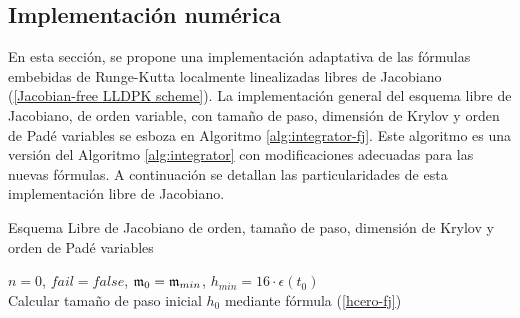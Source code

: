 \subsection{Implementación numérica}

En esta sección, se propone una implementación adaptativa de las fórmulas embebidas de Runge-Kutta localmente linealizadas libres de Jacobiano (\ref{Jacobian-free LLDPK scheme}). La implementación general del esquema libre de Jacobiano, de orden variable, con tamaño de paso, dimensión de Krylov y orden de Padé variables se esboza en Algoritmo \ref{alg:integrator-fj}. Este algoritmo es una versión del Algoritmo \ref{alg:integrator} con modificaciones adecuadas para las nuevas fórmulas. A continuación se detallan las particularidades de esta implementación libre de Jacobiano.

{\SetAlgoNoLine
	\begin{algorithm}[htb]
		\caption{Esquema Libre de Jacobiano de orden, tamaño de paso, dimensión de Krylov y orden de Padé variables}
		\label{alg:integrator-fj}
		$n=0$, $fail=false$, $\mathfrak{m}_0=\mathfrak{m}_{min}$, $h_{min}=16 \cdot \epsilon(t_0)$ \\
		Calcular tamaño de paso inicial $h_0$ mediante fórmula (\ref{hcero-fj}) \\
\end{algorithm}}
